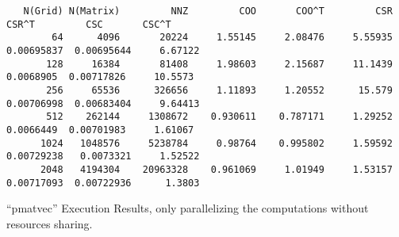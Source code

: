 \documentclass[]{article}
\begin{document}
\begin{lstlisting}
   N(Grid) N(Matrix)         NNZ         COO       COO^T         CSR       CSR^T         CSC       CSC^T
        64      4096       20224     1.55145     2.08476     5.55935  0.00695837  0.00695644     6.67122
       128     16384       81408     1.98603     2.15687     11.1439   0.0068905  0.00717826     10.5573
       256     65536      326656     1.11893     1.20552      15.579  0.00706998  0.00683404     9.64413
       512    262144     1308672    0.930611    0.787171     1.29252   0.0066449  0.00701983     1.61067
      1024   1048576     5238784     0.98764    0.995802     1.59592  0.00729238   0.0073321     1.52522
      2048   4194304    20963328    0.961069     1.01949     1.53157  0.00717093  0.00722936      1.3803
    \end{lstlisting}
    ``pmatvec'' Execution Results, only parallelizing the computations without resources sharing. 
\end{document}

